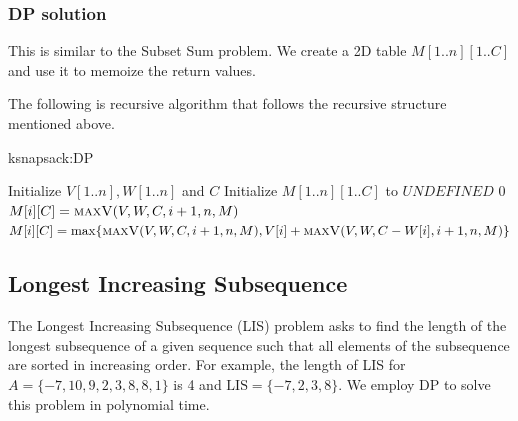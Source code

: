 \documentclass[11pt]{article}
\theoremstyle{definition}
\begin{document}
\subsubsection{DP solution}
This is similar to the Subset Sum problem. We create a 2D table $M[1..n][1..C]$ and use it to memoize the return values. 

The following is recursive algorithm that  follows the recursive structure mentioned above.

\begin{algorithm}[H]
\caption{ksnapsack:DP}\label{ksnapsack:DP}
\begin{algorithmic}[1]
\State Initialize $V[1..n], W[1..n]$ and $C$
\State Initialize $M[1..n][1..C]$ to $UNDEFINED$
\State{}
\EndFunction
\State{\null}
    \State\Return $0$
    \EndIf
    \State {}
    \EndIf
    \State\Return $M[i][C]=\Call{maxV}{V, W, C, i+1, n, M}$
    \Else 
    \State\Return $M[i][C]=\max\{\Call{maxV}{V, W, C, i+1, n, M}, V[i]+\Call{maxV}{V, W, C-W[i], i+1, n, M}\}$
    \EndIf
\EndFunction
\end{algorithmic}
\end{algorithm}

\subsection{Longest Increasing Subsequence}
The Longest Increasing Subsequence (LIS) problem asks to find the length of the longest subsequence of a given sequence such that all elements of the subsequence are sorted in increasing order. For example, the length of LIS for $A=\{-7, 10, 9, 2, 3, 8, 8, 1\}$ is 4 and $\text{LIS}=\{-7, 2, 3, 8\}$. We employ DP to solve this problem in polynomial time.
\end{document}
